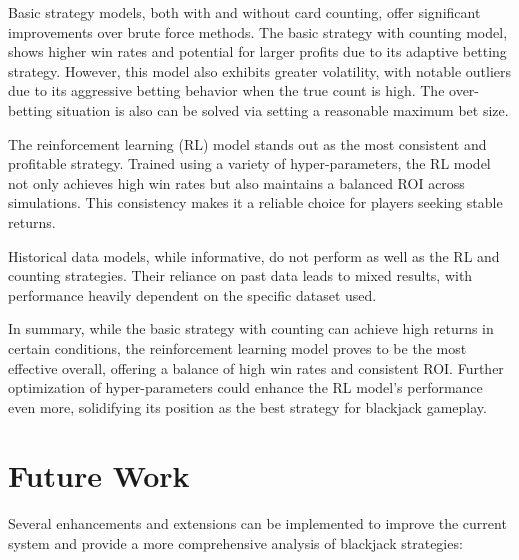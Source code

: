 \documentclass[a4paper,12pt]{report}
\begin{document}
Basic strategy models, both with and without card counting, offer significant improvements over brute force methods. The basic strategy with counting model, shows higher win rates and potential for larger profits due to its adaptive betting strategy. However, this model also exhibits greater volatility, with notable outliers due to its aggressive betting behavior when the true count is high. The over-betting situation is also can be solved via setting a reasonable maximum bet size.

The reinforcement learning (RL) model stands out as the most consistent and profitable strategy. Trained using a variety of hyper-parameters, the RL model not only achieves high win rates but also maintains a balanced ROI across simulations. This consistency makes it a reliable choice for players seeking stable returns.

Historical data models, while informative, do not perform as well as the RL and counting strategies. Their reliance on past data leads to mixed results, with performance heavily dependent on the specific dataset used.

In summary, while the basic strategy with counting can achieve high returns in certain conditions, the reinforcement learning model proves to be the most effective overall, offering a balance of high win rates and consistent ROI. Further optimization of hyper-parameters could enhance the RL model's performance even more, solidifying its position as the best strategy for blackjack gameplay.

\section{Future Work}
Several enhancements and extensions can be implemented to improve the current system and provide a more comprehensive analysis of blackjack strategies:
\end{document}
